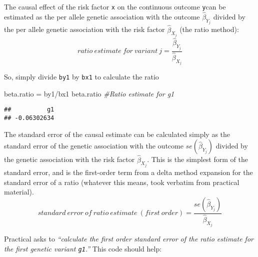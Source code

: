 \documentclass[
]{article}
\newenvironment{Shaded}{\begin{snugshade}}{\end{snugshade}}
\newcommand{\CommentTok}[1]{\textcolor[rgb]{0.56,0.35,0.01}{\textit{#1}}}
\newcommand{\DecValTok}[1]{\textcolor[rgb]{0.00,0.00,0.81}{#1}}
\newcommand{\FunctionTok}[1]{\textcolor[rgb]{0.00,0.00,0.00}{#1}}
\newcommand{\NormalTok}[1]{#1}
\newcommand{\OtherTok}[1]{\textcolor[rgb]{0.56,0.35,0.01}{#1}}
\newcommand{\SpecialCharTok}[1]{\textcolor[rgb]{0.00,0.00,0.00}{#1}}
\begin{document}
The causal effect of the risk factor \texttt{x} on the continuous
outcome \texttt{y}can be estimated as the per allele genetic association
with the outcome \(\hat{\beta}_{Y_{j}}\) divided by the per allele
genetic association with the risk factor \(\hat{\beta}_{X_{j}}\) (the
ratio method):
\[ratio\ estimate\ for\ variant\ j = \frac{\hat{\beta}_{Y_{j}}}{\hat{\beta}_{X_{j}}}\]
\vspace{6pt}

\begin{Shaded}
\end{Shaded}

So, simply divide \texttt{by1} by \texttt{bx1} to calculate the ratio

\begin{Shaded}
\begin{Highlighting}[]
\NormalTok{beta.ratio }\OtherTok{=}\NormalTok{ by1}\SpecialCharTok{/}\NormalTok{bx1}
\NormalTok{beta.ratio }\CommentTok{\#Ratio estimate for g1}
\end{Highlighting}
\end{Shaded}

\begin{verbatim}
##          g1 
## -0.06302634
\end{verbatim}

The standard error of the causal estimate can be calculated simply as
the standard error of the genetic association with the outcome
\(se(\hat{\beta}_{Y_{j}})\) divided by the genetic association with the
risk factor \(\hat{\beta}_{X_{j}}\). This is the simplest form of the
standard error, and is the first-order term from a delta method
expansion for the standard error of a ratio (whatever this means, took
verbatim from practical material).
\[standard\ error\ of\ ratio\ estimate\ (first\ order) = \frac{se(\hat{\beta}_{Y_{j}})}{\hat{\beta}_{X_{j}}}\]
\vspace{6pt}

Practical asks to \emph{``calculate the first order standard error of
the ratio estimate for the first genetic variant \texttt{g1}.''} This
code should help:
\end{document}
